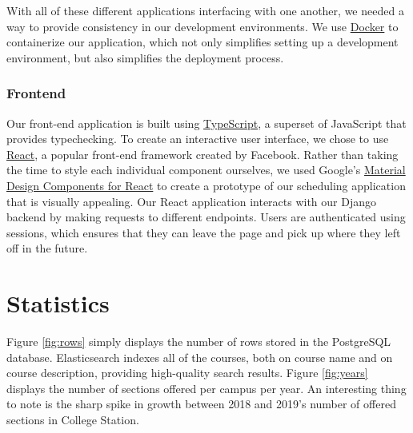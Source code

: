 \documentclass{article}
\begin{document}
With all of these different applications interfacing with one another, we needed a way to provide consistency in our development environments. We use \href{https://docker.com}{Docker} to containerize our application, which not only simplifies setting up a development environment, but also simplifies the deployment process.

\subsubsection{Frontend}

Our front-end application is built using \href{http://www.typescriptlang.org/}{TypeScript}, a superset of JavaScript that provides typechecking. To create an interactive user interface, we chose to use \href{reactjs.org}{React}, a popular front-end framework created by Facebook. Rather than taking the time to style each individual component ourselves, we used Google's \href{https://github.com/material-components/material-components-web-react}{Material Design Components for React} to create a prototype of our scheduling application that is visually appealing. Our React application interacts with our Django backend by making requests to different endpoints. Users are authenticated using sessions, which ensures that they can leave the page and pick up where they left off in the future.

\section{Statistics}

Figure \ref{fig:rows} simply displays the number of rows stored in the PostgreSQL database.  Elasticsearch indexes all of the courses, both on course name and on course description, providing high-quality search results. Figure \ref{fig:years} displays the number of sections offered per campus per year. An interesting thing to note is the sharp spike in growth between 2018 and 2019's number of offered sections in College Station.
\end{document}

